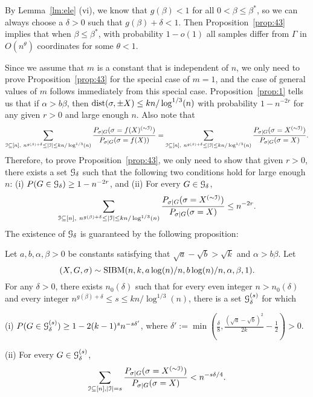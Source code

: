 \documentclass{article}
\begin{document}
By Lemma~\ref{lm:ele} (vi), we know that $g(\beta)<1$ for all $0<\beta\le\beta^\ast$, so we can always choose a $\delta>0$ such that $g(\beta)+\delta<1$.
Then Proposition~\ref{prop:43} implies that when $\beta\le\beta^\ast$, with probability $1-o(1)$ all samples differ from $\Gamma$ in $O(n^\theta)$ coordinates for some $\theta<1$.


Since we assume that $m$ is a constant that is independent of $n$,
we only need to prove Proposition~\ref{prop:43} for the special case of $m=1$, and the case of general values of $m$ follows immediately from this special case.
Proposition~\ref{prop:1} tells us that if $\alpha>b\beta$, then $\operatorname{dist}(\sigma,\pm X) \le kn/\log^{1/3}(n)$
 with probability $1-n^{-2r}$ for any given $r>0$ and large enough $n$.
Also note that
\begin{align*}
 \sum_{\mathcal{I}\subseteq[n],~
n^{g(\beta)+\delta}
\le |\mathcal{I}|\le kn/\log^{1/3}(n)}
\frac{P_{\sigma|G}(\sigma=f(X)^{(\sim\mathcal{I})})}{P_{\sigma|G}(\sigma=f(X))} 
=  \sum_{\mathcal{I}\subseteq[n],~
n^{g(\beta)+\delta}
\le |\mathcal{I}|\le kn/\log^{1/3}(n)}
\frac{P_{\sigma|G}(\sigma=X^{(\sim\mathcal{I})})}{P_{\sigma|G}(\sigma=X)} .
\end{align*}
Therefore, to prove Proposition~\ref{prop:43}, we only need to show that given $r>0$, there exists a set $\mathcal{G}_{\delta}$ such that the following two conditions hold for large enough $n$:  (i)
$P(G\in\mathcal{G}_{\delta})\ge 1-n^{-2r}$, and (ii)
For every $G\in\mathcal{G}_{\delta}$,
$$
\sum_{\mathcal{I}\subseteq[n],~
n^{g(\beta)+\delta}
\le |\mathcal{I}|\le kn/\log^{1/3}(n)}
\frac{P_{\sigma|G}(\sigma=X^{(\sim\mathcal{I})})}{P_{\sigma|G}(\sigma=X)} \le n^{-2r} .
$$
The existence of $\mathcal{G}_{\delta}$ is guaranteed by the following proposition:
\begin{proposition} \label{prop:xz}
Let $a,b,\alpha,\beta> 0$ be constants satisfying that $\sqrt{a}-\sqrt{b} > \sqrt{k}$ and $\alpha>b\beta$.
Let 
$$
(X,G,\sigma) \sim \operatorname{SIBM}(n, k, a\log(n)/n, b\log(n)/n,\alpha,\beta, 1) .
$$
For any $\delta>0$, there exists $n_0(\delta)$ such that
for every even integer $n>n_0(\delta)$ and
every integer $n^{g(\beta)+\delta} \le s \le kn/\log^{1/3}(n)$,
there is a set $\mathcal{G}_{\delta}^{(s)}$ for which

\noindent (i)
$P(G\in\mathcal{G}_\delta^{(s)}) \ge 1- 2(k-1)^s n^{-s\delta'}$,
where $\delta':=\min(\frac{\delta}{8},\frac{(\sqrt{a}-\sqrt{b})^2}{2k} - \frac{1}{2}) >0$.

\noindent (ii) For every $G\in\mathcal{G}_\delta^{(s)}$,
$$
\sum_{\mathcal{I}\subseteq[n],|\mathcal{I}|=s}
\frac{P_{\sigma|G}(\sigma=X^{(\sim \mathcal{I})} )}
{P_{\sigma|G}(\sigma=X)} <
n^{-s \delta /4} .
$$
\end{proposition}
\end{document}
